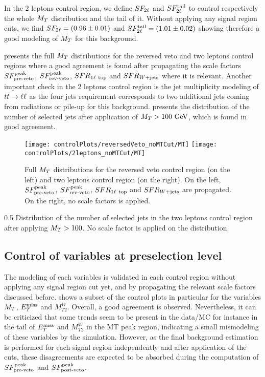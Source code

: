     In the 2 leptons control region, we define $SF_{2\ell}$ and $SF_{2\ell}^{\text{tail}}$
    to control respectively the whole $M_T$ distribution and the tail of it.
    Without applying any signal region cuts, we find $SF_{2\ell} = (0.96 \pm
    0.01)$ and $SF_{2\ell}^{\text{tail}} = (1.01 \pm 0.02)$ showing therefore a good
    modeling of $M_T$ for this background.

     presents the full $M_T$
    distributions for the reversed veto and two leptons control regions where a
    good agreement is found after propagating the scale factors $SF_{\text{pre-veto}}^{\text{peak}}$,
    $SF_{\text{rev-veto}}^{\text{peak}}$, $SFR_{1\ell~\text{top}}$ and $SFR_{\text{$W$+jets}}$ where it is relevant.  Another
    important check in the 2 leptons control region is the jet multiplicity
    modeling of $t\bar{t} \rightarrow \ell \ell$ as the four jets requirement corresponds to two
    additional jets coming from radiations or pile-up for this background.
     presents the distribution of the
    number of selected jets after application of $M_T>100~\text{GeV}$, which is found
    in good agreement.

    \begin{figure}[h!]
        \centering
        \texttt{[image: controlPlots/reversedVeto\_noMTCut/MT]}
        \texttt{[image: controlPlots/2leptons\_noMTCut/MT]}
        \caption{Full $M_T$ distributions for the reversed veto control region
        (on the left) and two leptons control region (on the right). On the
        left, $SF_{\text{pre-veto}}^{\text{peak}}$, $SF_{\text{rev-veto}}^{\text{peak}}$, $SFR_{1\ell~\text{top}}$ and $SFR_{\text{$W$+jets}}$ are
        propagated. On the right, no scale factors is applied.}
        \label{fig:preselMT2leptonAndLepPlusVeto}
    \end{figure}

                 {0.5}
                 {Distribution of the number of selected jets in the two leptons
                 control region after applying $M_T > 100$. No scale factor is
                 applied on the distribution.}

    \subsection{Control of variables at preselection level}

    The modeling of each variables is validated in each control region without
    applying any signal region cut yet, and by propagating the relevant scale
    factors discussed before.  shows a subset of
    the control plots in particular for the variables $M_T$, $E_T^\text{miss}$ and
    $M_{T2}^W$. Overall, a good agreement is observed. Nevertheless, it can be
    criticized that some trends seem to be present in the data/MC for instance
    in the tail of $E_T^\text{miss}$ and $M_{T2}^W$ in the MT peak region, indicating a
    small mismodeling of these variables by the simulation. However, as the
    final background estimation is performed for each signal region
    independently and after application of the cuts, these disagreements are
    expected to be absorbed during the computation of $SF_{\text{pre-veto}}^{\text{peak}}$ and $SF_{\text{post-veto}}^{\text{peak}}$.

